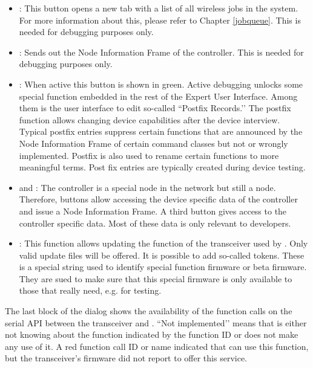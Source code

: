 \begin{itemize}

\item {}: This button opens a new tab with a list of all wireless jobs in 
the system. For more information about this, please refer to Chapter \ref{jobqueue}. 
This is needed for debugging purposes only.
\item {}: Sends out the Node Information Frame of the \zway controller. 
This is needed for debugging purposes only.
\item {}: When active this button is shown in green. Active debugging unlocks 
some special function embedded in the rest of the Expert User Interface. Among them is the 
user interface to edit so-called ``Postfix Records.’’ The postfix function allows changing 
device capabilities after the device interview. Typical postfix entries suppress certain 
functions that are announced by the Node Information Frame of certain command classes but 
not or wrongly implemented. Postfix is also used to rename certain functions to more 
meaningful terms. Post fix entries are typically created during device testing.
\item {} and : The controller is a 
special node in the network but still a node. Therefore, buttons allow accessing the device 
specific data of the controller and issue a Node Information Frame. A third button gives 
access to the controller specific data. Most of these data is only relevant to developers.

\item {}: This function allows updating the function of the \zwave 
transceiver used by \zway. Only valid update files will be offered. It is possible to 
add so-called tokens. These is a special string used to identify special function 
firmware or beta firmware. They are sued to make sure that this special firmware is only 
available to those that really need, e.g. for testing.
\end{itemize}


The last block of the dialog shows the availability of the function calls on the serial 
API between the \zwave transceiver and \zway. ``Not implemented’’ means that \zway is 
either not knowing about the function indicated by the function ID or does not make any 
use of it. A red function call ID or name indicated that \zway can use this function, but 
the transceiver’s firmware did not report to offer this service.

